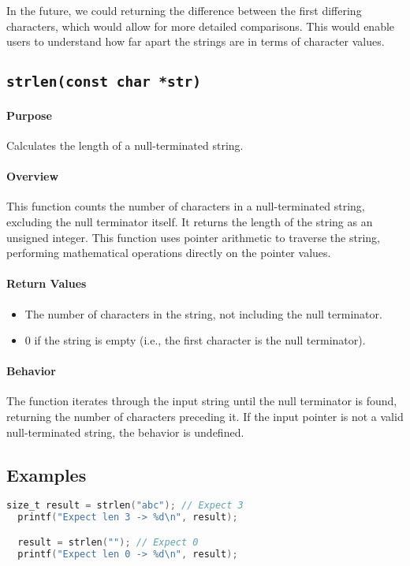 \begin{note}
In the future, we could returning the difference between the first differing 
characters, which would allow for more detailed comparisons. This would enable 
users to understand how far apart the strings are in terms of character values.
\end{note}

\subsection{\texttt{strlen(const char *str)}}

\paragraph{Purpose}
Calculates the length of a null-terminated string.

\paragraph{Overview}
This function counts the number of characters in a null-terminated string,
excluding the null terminator itself. It returns the length of the string as an
unsigned integer. This function uses pointer arithmetic to traverse the string, 
performing mathematical operations directly on the pointer values.

\paragraph{Return Values}
\begin{itemize}
    \item The number of characters in the string, not including the null terminator.
    \item 0 if the string is empty (i.e., the first character is the null terminator).
\end{itemize}

\paragraph{Behavior}
The function iterates through the input string until the null terminator is found, returning 
the number of characters preceding it. If the input pointer is not a valid 
null-terminated string, the behavior is undefined.

\subsection*{Examples}
\begin{lstlisting}[language=C, caption=String Length Example]
  size_t result = strlen("abc"); // Expect 3
  printf("Expect len 3 -> %d\n", result);

  result = strlen(""); // Expect 0
  printf("Expect len 0 -> %d\n", result);
\end{lstlisting}
